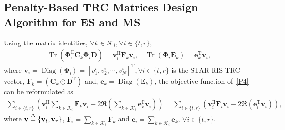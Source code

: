 \documentclass[12pt, draftclsnofoot, onecolumn]{IEEEtran}
\DeclareMathOperator{\Diag}{Diag}
\DeclareMathOperator{\tr}{Tr}
\begin{document}
\subsection{Penalty-Based TRC Matrices Design Algorithm for ES and MS}
Using the matrix identities, $\forall k \in \mathcal{K}_i, \forall i \in \{t,r\}$,
\begin{equation}
\begin{aligned}
\tr\left(\mathbf{\Phi}_i^\mathrm{H}\mathbf{C}_k\mathbf{\Phi}_i\mathbf{D}\right)=\mathbf{v}_i^\mathrm{H}\mathbf{F}_k\mathbf{v}_i, \quad \tr\left(\mathbf{\Phi}_i\mathbf{E}_k\right)=\mathbf{e}_k^\mathrm{T}\mathbf{v}_i,
\end{aligned}
\end{equation}
where $\mathbf{v}_{i}=\Diag\left(\mathbf{\Phi}_{i}\right)=\left[v^i_1, v^i_2, \cdots, v^i_N\right]^{\mathrm{T}}, \forall i \in \{t,r\}$  is the STAR-RIS TRC vector, $\mathbf{F}_k=\left(\mathbf{C}_k \odot \mathbf{D}^\mathrm{T}\right)$ and, $\mathbf{e}_{k}=\Diag\left(\mathbf{E}_{k}\right)$, the objective function of~\eqref{P4} can be reformulated as 
\begin{equation}\label{Gk}
\begin{aligned}
\sum\nolimits_{i\in \{t,r\}}\left(\mathbf{v}_i^\mathrm{H}\sum\nolimits_{k\in\mathcal{K}_i}\mathbf{F}_k\mathbf{v}_i-2\Re\left(\sum\nolimits_{k\in\mathcal{K}_i}\mathbf{e}_k^\mathrm{T}\mathbf{v}_i\right)\right)=\sum\nolimits_{i\in \{t,r\}}\left(\mathbf{v}_i^\mathrm{H}\mathbf{F}_i\mathbf{v}_i-2\Re\left(\mathbf{e}_i^\mathrm{T}\mathbf{v}_i\right)\right),
\end{aligned}
\end{equation}
where $\mathbf{v}\buildrel \Delta \over = \left\{\mathbf{v}_t, \mathbf{v}_r\right\}$, $\mathbf{F}_i=\sum_{k\in\mathcal{K}_i}\mathbf{F}_k$ and $\mathbf{e}_i=\sum_{k\in\mathcal{K}_i}\mathbf{e}_k$, $\forall i\in\{t,r\}$.
\end{document}
